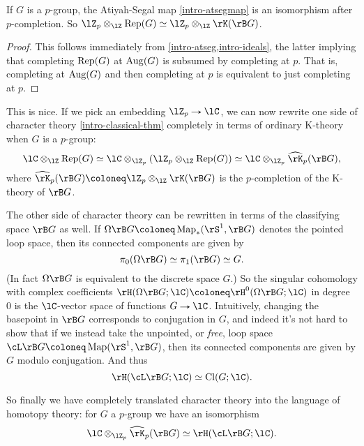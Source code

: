 \begin{lemma}
  \label{intro-completions}
  If $G$ is a $p$-group, the Atiyah-Segal map \cref{intro-atsegmap} is
  an isomorphism after $p$-completion. So
  $\lZ_p \otimes_\lZ \Rep(G) \iso \lZ_p \otimes_\lZ \rK(\rB G)$.
\end{lemma}

\begin{proof}
  This follows immediately from \cref{intro-atseg,intro-ideals}, the
  latter implying that completing $\operatorname{Rep}(G)$ at $\operatorname{Aug}(G)$ is subsumed
  by completing at $p$. That is, completing at $\operatorname{Aug}(G)$ and then
  completing at $p$ is equivalent to just completing at $p$.
\end{proof}

This is nice. If we pick an embedding $\lZ_p \to \lC$, we can now
rewrite one side of character theory \cref{intro-classical-thm}
completely in terms of ordinary K-theory when $G$ is a $p$-group:
\[
\lC \otimes_\lZ \Rep(G) \iso
\lC \otimes_{\lZ_p} (\lZ_p \otimes_\lZ \Rep(G)) \iso
\lC \otimes_{\lZ_p} \hat\rK_p(\rB G),
\]
where $\hat\rK_p(\rB G) \ce \lZ_p \otimes_\lZ \rK(\rB G)$ is the
$p$-completion of the K-theory of $\rB G$.

The other side of character theory can be rewritten in terms of the
classifying space $\rB G$ as well. If
$\Omega\rB G \ce \Map_*(\rS^1,\rB G)$ denotes the pointed loop space,
then its connected components are given by
\[
\pi_0(\Omega\rB G) \iso \pi_1(\rB G) \iso G.
\]
(In fact $\Omega\rB G$ is equivalent to the discrete space $G$.) So
the singular cohomology with complex coefficients
$\rH(\Omega\rB G;\lC) \ce \rH^0(\Omega\rB G;\lC)$ in degree $0$ is the
$\lC$-vector space of functions $G \to \lC$. Intuitively, changing the
basepoint in $\rB G$ corresponds to conjugation in $G$, and indeed
it's not hard to show that if we instead take the unpointed, or
\emph{free}, loop space $\cL \rB G \ce \Map(\rS^1,\rB G)$, then its
connected components are given by $G$ modulo conjugation. And thus
\[
\rH(\cL\rB G;\lC) \iso \Cl(G;\lC).
\]

So finally we have completely translated character theory into the
language of homotopy theory: for $G$ a $p$-group we have an
isomorphism
\begin{equation}
  \label{intro-translated}
  \lC \otimes_{\lZ_p} \hat\rK_p(\rB G) \iso \rH(\cL\rB G; \lC).
\end{equation}


